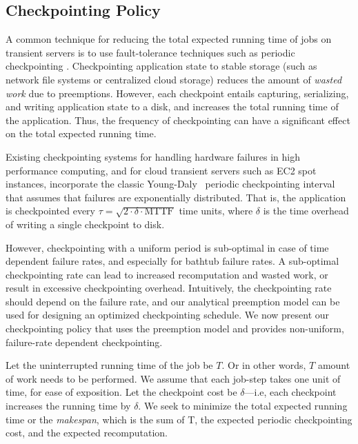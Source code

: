 

\subsection{Checkpointing Policy}

A common technique for reducing the total expected running time of jobs on transient servers is to use fault-tolerance techniques such as periodic checkpointing \cite{flint}.
Checkpointing application state to stable storage (such as network file systems or centralized cloud storage) reduces the amount of \emph{wasted work} due to preemptions.
However, each checkpoint entails capturing, serializing, and writing application state to a disk, and increases the total running time of the application.
Thus, the frequency of checkpointing can have a significant effect on the total expected running time.

Existing checkpointing systems for handling hardware failures in high performance computing, and for cloud transient servers such as EC2 spot instances, incorporate the classic Young-Daly~\cite{dongarra_fault_nodate, daly2006higher, flint, marathe2014exploiting} periodic checkpointing interval that assumes that failures are exponentially distributed. 
That is, the application is checkpointed every $\tau = \sqrt{2 \cdot \delta \cdot \text{MTTF}}$ time units, where $\delta$ is the time overhead of writing a single checkpoint to disk. 


However, checkpointing with a uniform period is sub-optimal in case of time dependent failure rates, and especially for bathtub failure rates.
A sub-optimal checkpointing rate can lead to increased recomputation and wasted work, or result in excessive checkpointing overhead. 
Intuitively, the checkpointing rate should depend on the failure rate, and our analytical preemption model can be used for designing an optimized checkpointing schedule. We now present our checkpointing policy that uses the preemption model and provides non-uniform, failure-rate dependent checkpointing. 


Let the uninterrupted running time of the job be $T$. Or in other words, $T$ amount of work needs to be performed. We assume that each job-step takes one unit of time, for ease of exposition. 
Let the checkpoint cost be $\delta$---i.e, each checkpoint increases the running time by $\delta$. 
We seek to minimize the total expected running time or the \emph{makespan}, which is the sum of T, the expected periodic checkpointing cost, and the expected recomputation.

